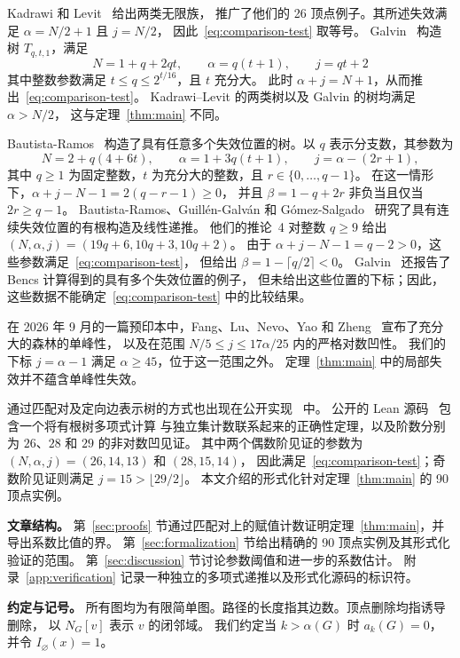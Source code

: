 \documentclass[UTF8,11pt,a4paper,fontset=fandol]{ctexart}
\theoremstyle{remark}
\numberwithin{equation}{section}
\begin{document}
Kadrawi 和 Levit~\cite[第~3--4 节]{KadrawiLevit2023} 给出两类无限族，
推广了他们的 26 顶点例子。其所述失效满足 $\alpha=N/2+1$ 且 $j=N/2$，
因此~\eqref{eq:comparison-test} 取等号。
Galvin~\cite[定理~2.1]{Galvin2026} 构造树 $T_{q,t,1}$，满足
\[
 N=1+q+2qt,\qquad \alpha=q(t+1),\qquad j=qt+2
\]
其中整数参数满足 $t\leq q\leq2^{t/16}$，且 $t$ 充分大。
此时 $\alpha+j=N+1$，从而推出~\eqref{eq:comparison-test}。
Kadrawi--Levit 的两类树以及 Galvin 的树均满足 $\alpha>N/2$，
这与定理~\ref{thm:main} 不同。

Bautista-Ramos~\cite[定义~1 和定理~1]{BautistaRamos2025}
构造了具有任意多个失效位置的树。以 $q$ 表示分支数，其参数为
\[
 N=2+q(4+6t),\qquad \alpha=1+3q(t+1),\qquad
 j=\alpha-(2r+1),
\]
其中 $q\geq1$ 为固定整数，$t$ 为充分大的整数，且 $r\in\{0,\ldots,q-1\}$。
在这一情形下，$\alpha+j-N-1=2(q-r-1)\geq0$，
并且 $\beta=1-q+2r$ 非负当且仅当 $2r\geq q-1$。
Bautista-Ramos、Guill\'en-Galv\'an 和 G\'omez-Salgado~\cite{BGG2026}
研究了具有连续失效位置的有根构造及线性递推。
他们的推论~4 对整数 $q\geq9$ 给出
$(N,\alpha,j)=(19q+6,10q+3,10q+2)$。
由于 $\alpha+j-N-1=q-2>0$，这些参数满足~\eqref{eq:comparison-test}，
但给出 $\beta=1-\lceil q/2\rceil<0$。
Galvin~\cite[第~3 节]{Galvin2026} 还报告了 Bencs 计算得到的具有多个失效位置的例子，
但未给出这些位置的下标；因此，这些数据不能确定~\eqref{eq:comparison-test} 中的比较结果。

在 2026 年 9 月的一篇预印本中，Fang、Lu、Nevo、Yao 和
Zheng~\cite[定理~1.1--1.2]{Fang2026} 宣布了充分大的森林的单峰性，
以及在范围 $N/5\leq j\leq17\alpha/25$ 内的严格对数凹性。
我们的下标 $j=\alpha-1$ 满足 $\alpha\geq45$，位于这一范围之外。
定理~\ref{thm:main} 中的局部失效并不蕴含单峰性失效。

通过匹配对及定向边表示树的方式也出现在公开实现~\cite{MatchingLift} 中。
公开的 Lean 源码~\cite{LeanWitnesses} 包含一个将有根树多项式计算
与独立集计数联系起来的正确性定理，以及阶数分别为 $26$、$28$ 和 $29$ 的非对数凹见证。
其中两个偶数阶见证的参数为 $(N,\alpha,j)=(26,14,13)$ 和 $(28,15,14)$，
因此满足~\eqref{eq:comparison-test}；奇数阶见证则满足 $j=15>\lfloor29/2\rfloor$。
本文介绍的形式化针对定理~\ref{thm:main} 的 90 顶点实例。

\noindent\textbf{文章结构。}
第~\ref{sec:proofs} 节通过匹配对上的赋值计数证明定理~\ref{thm:main}，并导出系数比值的界。
第~\ref{sec:formalization} 节给出精确的 90 顶点实例及其形式化验证的范围。
第~\ref{sec:discussion} 节讨论参数阈值和进一步的系数估计。
附录~\ref{app:verification} 记录一种独立的多项式递推以及形式化源码的标识符。

\noindent\textbf{约定与记号。}
所有图均为有限简单图。路径的长度指其边数。顶点删除均指诱导删除，
以 $N_G[v]$ 表示 $v$ 的闭邻域。
我们约定当 $k>\alpha(G)$ 时 $a_k(G)=0$，并令 $I_{\varnothing}(x)=1$。
\end{document}
